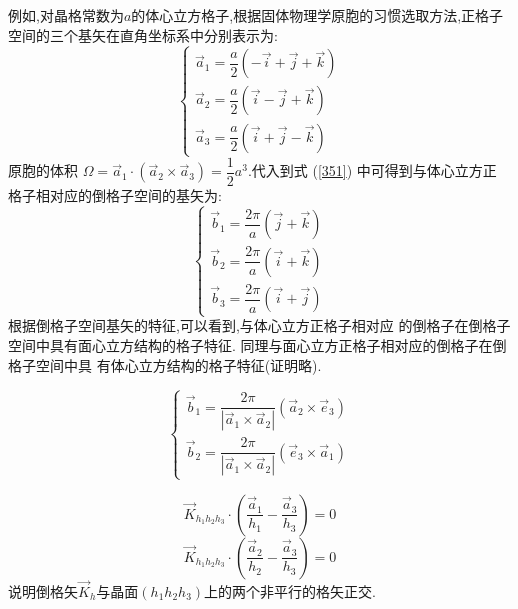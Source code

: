 \documentclass[UTF8,10pt,a4paper,oneside]{ctexart}
\begin{document}
    {例如,对晶格常数为$a$的体心立方格子,根据固体物理学原胞的习惯选取方法,正格子空间的三个基矢在直角坐标系中分别表示为:$$
        \left\{\begin{array}{l}
        \vec{a}_{1}=\dfrac{a}{2}(-\vec{i}+\vec{j}+\vec{k}) \\
        \vec{a}_{2}=\dfrac{a}{2}(\vec{i}-\vec{j}+\vec{k}) \\
        \vec{a}_{3}=\dfrac{a}{2}(\vec{i}+\vec{j}-\vec{k})
        \end{array}\right.
        $$
        原胞的体积 $\Omega=\vec{a}_{1} \cdot\left(\vec{a}_{2} \times \vec{a}_{3}\right)=\dfrac{1}{2} {a}^{3}$.代入到式 (\ref{351}) 中可得到与体心立方正 格子相对应的倒格子空间的基矢为:
        $$
        \left\{\begin{array}{l}
        \vec{b}_{1}=\dfrac{2 \pi}{a}(\vec{j}+\vec{k}) \\
        \vec{b}_{2}=\dfrac{2 \pi}{a}(\vec{i}+\vec{k}) \\
        \vec{b}_{3}=\dfrac{2 \pi}{a}(\vec{i}+\vec{j})
        \end{array}\right.
        $$根据倒格子空间基矢的特征,可以看到,与体心立方正格子相对应
        的倒格子在倒格子空间中具有面心立方结构的格子特征.
        同理与面心立方正格子相对应的倒格子在倒格子空间中具
        有体心立方结构的格子特征(证明略).}

    {\[\left\{\begin{array}{l}
            \vec{b}_{1}=\dfrac{2 \pi}{|\vec{a}_{1} \times \vec{a}_{2}|}(\vec{a}_{2} \times \vec{e}_{3}) \\
            \vec{b}_{2}=\dfrac{2 \pi}{|\vec{a}_{1} \times \vec{a}_{2}|}(\vec{e}_{3} \times \vec{a}_{1})
            \end{array}\right.\]}
  
    {\[\vec{K}_{h_{1} h_{2} h_{3}} \cdot(\dfrac{\vec{a}_{1}}{h_{1}}-\dfrac{\vec{a}_{3}}{h_{3}})=0\]
        \[\vec{K}_{h_{1} h_{2} h_{3}} \cdot(\dfrac{\vec{a}_{2}}{h_{2}}-\dfrac{\vec{a}_{3}}{h_{3}})=0
        \]说明倒格矢$\vec{K}_{h}$与晶面$(h_1h_2h_3)$上的两个非平行的格矢正交.}
\end{document}
